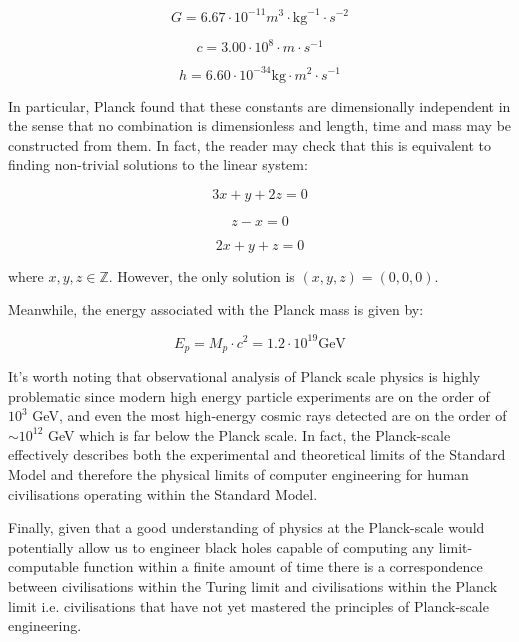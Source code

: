\documentclass{article}
\begin{document}
\begin{equation}
G = 6.67 \cdot 10^{-11} m^3 \cdot \text{kg}^{-1} \cdot s^{-2}
\end{equation}

\begin{equation}
c = 3.00 \cdot 10^8 \cdot m \cdot s^{-1}
\end{equation}

\begin{equation}
h = 6.60 \cdot 10^{-34} \text{kg} \cdot m^2 \cdot s^{-1}
\end{equation}

In particular, Planck found that these constants are dimensionally independent in the sense that no combination is dimensionless and length, time and mass may be constructed from them. In fact, the reader may check that this is equivalent to finding non-trivial solutions to the linear system:

\begin{equation}
3x+y+2z = 0
\end{equation}

\begin{equation}
z-x = 0
\end{equation}

\begin{equation}
2x+y+z = 0
\end{equation}

where $x,y,z \in \mathbb{Z}$. However, the only solution is $(x,y,z) = (0,0,0)$.

Meanwhile, the energy associated with the Planck mass is given by:

\begin{equation}
E_p = M_p \cdot c^2 = 1.2 \cdot 10^{19} \textrm{GeV}
\end{equation}

It's worth noting that observational analysis of Planck scale physics is highly problematic since modern high energy particle experiments are on the order of $10^3$ GeV, and even the most high-energy cosmic rays detected are on the order of $\sim 10^{12}$ GeV which is far below the Planck scale. In fact, the Planck-scale effectively describes both the experimental and theoretical limits of the Standard Model and therefore the physical limits of computer engineering for human civilisations operating within the Standard Model.

Finally, given that a good understanding of physics at the Planck-scale would potentially allow us to engineer black holes capable of computing any limit-computable function within a finite amount of time there is a correspondence between civilisations within the Turing limit and civilisations within the Planck limit i.e. civilisations that have not yet mastered
the principles of Planck-scale engineering.
\end{document}
